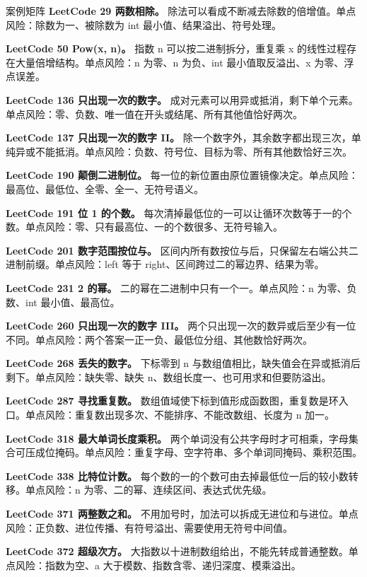 \begin{principlebox}{案例矩阵}
\textbf{LeetCode 29 两数相除。}
除法可以看成不断减去除数的倍增值。单点风险：除数为一、被除数为 int 最小值、结果溢出、符号处理。

\textbf{LeetCode 50 Pow(x, n)。}
指数 n 可以按二进制拆分，重复乘 x 的线性过程存在大量倍增结构。单点风险：n 为零、n 为负、int 最小值取反溢出、x 为零、浮点误差。

\textbf{LeetCode 136 只出现一次的数字。}
成对元素可以用异或抵消，剩下单个元素。单点风险：零、负数、唯一值在开头或结尾、所有其他值恰好两次。

\textbf{LeetCode 137 只出现一次的数字 II。}
除一个数字外，其余数字都出现三次，单纯异或不能抵消。单点风险：负数、符号位、目标为零、所有其他数恰好三次。

\textbf{LeetCode 190 颠倒二进制位。}
每一位的新位置由原位置镜像决定。单点风险：最高位、最低位、全零、全一、无符号语义。

\textbf{LeetCode 191 位 1 的个数。}
每次清掉最低位的一可以让循环次数等于一的个数。单点风险：零、只有最高位、一的个数很多、无符号输入。

\textbf{LeetCode 201 数字范围按位与。}
区间内所有数按位与后，只保留左右端公共二进制前缀。单点风险：left 等于 right、区间跨过二的幂边界、结果为零。

\textbf{LeetCode 231 2 的幂。}
二的幂在二进制中只有一个一。单点风险：n 为零、负数、int 最小值、最高位。

\textbf{LeetCode 260 只出现一次的数字 III。}
两个只出现一次的数异或后至少有一位不同。单点风险：两个答案一正一负、最低位分组、其他数恰好两次。

\textbf{LeetCode 268 丢失的数字。}
下标零到 n 与数组值相比，缺失值会在异或抵消后剩下。单点风险：缺失零、缺失 n、数组长度一、也可用求和但要防溢出。

\textbf{LeetCode 287 寻找重复数。}
数组值域使下标到值形成函数图，重复数是环入口。单点风险：重复数出现多次、不能排序、不能改数组、长度为 n 加一。

\textbf{LeetCode 318 最大单词长度乘积。}
两个单词没有公共字母时才可相乘，字母集合可压成位掩码。单点风险：重复字母、空字符串、多个单词同掩码、乘积范围。

\textbf{LeetCode 338 比特位计数。}
每个数的一的个数可由去掉最低位一后的较小数转移。单点风险：n 为零、二的幂、连续区间、表达式优先级。

\textbf{LeetCode 371 两整数之和。}
不用加号时，加法可以拆成无进位和与进位。单点风险：正负数、进位传播、有符号溢出、需要使用无符号中间值。

\textbf{LeetCode 372 超级次方。}
大指数以十进制数组给出，不能先转成普通整数。单点风险：指数为空、a 大于模数、指数含零、递归深度、模乘溢出。


\end{principlebox}
